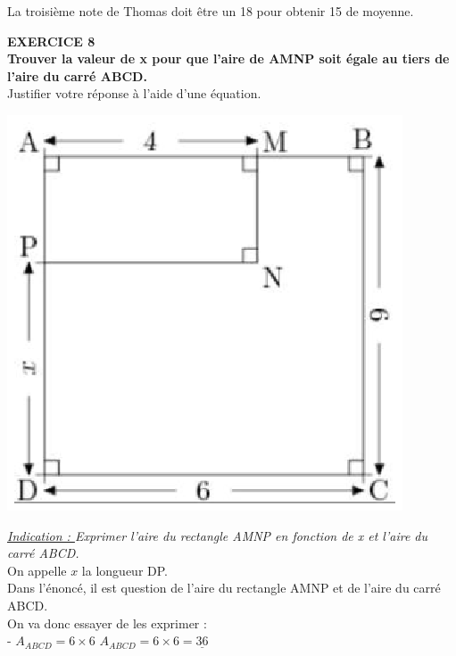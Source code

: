 \documentclass[a4paper,11pt]{article}
\begin{document}
La troisième note de Thomas doit être un 18 pour obtenir 15 de moyenne.\\

\color{black}

 
\textbf{EXERCICE 8}\\
 \textbf{Trouver la valeur de x pour que l'aire de AMNP soit égale au tiers de l'aire du carré ABCD.}\\
 Justifier votre réponse à l'aide d'une équation.\\


\begin{center}
\includegraphics[scale=0.9]{carre.eps} 

\end{center}

\textit{\underline{Indication : } Exprimer l'aire du rectangle AMNP en fonction de x et l'aire du carré ABCD.}\\ 

\color{red}
On appelle $x$ la longueur DP.\\


Dans l'énoncé, il est question de l'aire du rectangle AMNP et de l'aire du carré ABCD.\\
On va donc essayer de les exprimer  :\\

- $A_{ABCD} = 6 \times 6$ \hspace*{1cm} $A_{ABCD} = 6 \times 6 = \underline{36} $ \\
\end{document}
